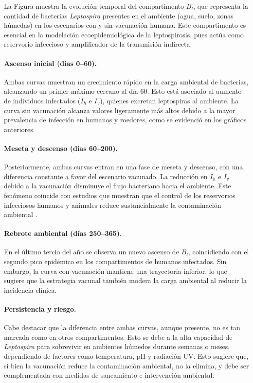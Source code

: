 \documentclass[12pt,a4paper]{article}
\begin{document}
La Figura muestra la evolución temporal del compartimento $B_l$, que representa la cantidad de bacterias \textit{Leptospira} presentes en el ambiente (agua, suelo, zonas húmedas) en los escenarios con y sin vacunación humana. Este compartimento es esencial en la modelación ecoepidemiológica de la leptospirosis, pues actúa como reservorio infeccioso y amplificador de la transmisión indirecta.


\paragraph{Ascenso inicial (días 0–60).} Ambas curvas muestran un crecimiento rápido en la carga ambiental de bacterias, alcanzando un primer máximo cercano al día 60. Esto está asociado al aumento de individuos infectados ($I_h$ e $I_v$), quienes excretan leptospiras al ambiente. La curva sin vacunación alcanza valores ligeramente más altos debido a la mayor prevalencia de infección en humanos y roedores, como se evidenció en los gráficos anteriores.

\paragraph{Meseta y descenso (días 60–200).} Posteriormente, ambas curvas entran en una fase de meseta y descenso, con una diferencia constante a favor del escenario vacunado. La reducción en $I_h$ e $I_v$ debido a la vacunación disminuye el flujo bacteriano hacia el ambiente. Este fenómeno coincide con estudios que muestran que el control de los reservorios infecciosos humanos y animales reduce sustancialmente la contaminación ambiental \cite{trueba2019}.

\paragraph{Rebrote ambiental (días 250–365).} En el último tercio del año se observa un nuevo ascenso de $B_l$, coincidiendo con el segundo pico epidémico en los compartimentos de humanos infectados. Sin embargo, la curva con vacunación mantiene una trayectoria inferior, lo que sugiere que la estrategia vacunal también modera la carga ambiental al reducir la incidencia clínica.

\paragraph{Persistencia y riesgo.} Cabe destacar que la diferencia entre ambas curvas, aunque presente, no es tan marcada como en otros compartimentos. Esto se debe a la alta capacidad de \textit{Leptospira} para sobrevivir en ambientes húmedos durante semanas o meses, dependiendo de factores como temperatura, pH y radiación UV. Esto sugiere que, si bien la vacunación reduce la contaminación ambiental, no la elimina, y debe ser complementada con medidas de saneamiento e intervención ambiental.
\end{document}
